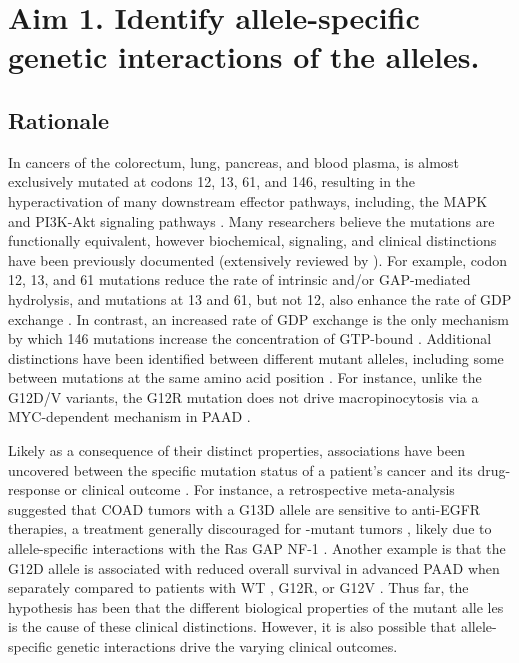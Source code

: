 \section{Aim 1. Identify allele-specific genetic interactions of the \KRAS{} alleles.}

\subsection*{Rationale}

In cancers of the colorectum, lung, pancreas, and blood plasma, \KRAS{} is almost exclusively mutated at codons 12, 13, 61, and 146, resulting in the hyperactivation of many downstream effector pathways, including, the MAPK and PI3K-Akt signaling pathways \cite{Simanshu2017}.
Many researchers believe the mutations are functionally equivalent, however biochemical, signaling, 
and clinical distinctions have been previously documented (extensively reviewed by \cite{Miller2012, Li2018}).
For example, codon 12, 13, and 61 mutations reduce the rate of intrinsic and/or GAP-mediated hydrolysis, and mutations at 13 and 61, but not 12, also enhance the rate of GDP exchange \cite{Hunter2015a, Smith2013}.
In contrast, an increased rate of GDP exchange is the only mechanism by which 146 mutations increase the concentration of GTP-bound \kras{} \cite{Feig1988RelationshipProteins., Edkins2006, Janakiraman2010, Poulin2019}.
Additional distinctions have been identified between different mutant alleles, including some between mutations at the same amino acid position \cite{Pershing2015, Hunter2015a, Poulin2019, Hobbs2019AtypicalCancer., Yuan2018, Kovalski2019, Ihle2012, Spoerner2004, Smith2014a, Pantsar2018}.
For instance, unlike the G12D/V variants, the G12R mutation does not drive macropinocytosis via a MYC-dependent mechanism in PAAD \cite{Hobbs2019AtypicalCancer.}.

Likely as a consequence of their distinct properties, associations have been uncovered between the specific \KRAS{} mutation status of a patient's cancer and its drug-response or clinical outcome \cite{Haigis2017, Li2018}.
For instance, a retrospective meta-analysis suggested that COAD tumors with a \KRAS{} G13D allele are sensitive to anti-EGFR therapies, a treatment generally discouraged for \KRAS{}-mutant tumors \cite{DeRoock2010}, likely due to allele-specific interactions with the Ras GAP NF-1 \cite{McFall2019, Rabara2019, Zafra2019}.
Another example is that the \KRAS{} G12D allele is associated with reduced overall survival in advanced PAAD when separately compared to patients with WT \KRAS{}, \KRAS{} G12R, or \KRAS{} G12V \cite{Bournet2016}.
Thus far, the hypothesis has been that the different biological properties of the mutant \KRAS{} alle les is the cause of these clinical distinctions.
However, it is also possible that allele-specific genetic interactions drive the varying clinical outcomes.

